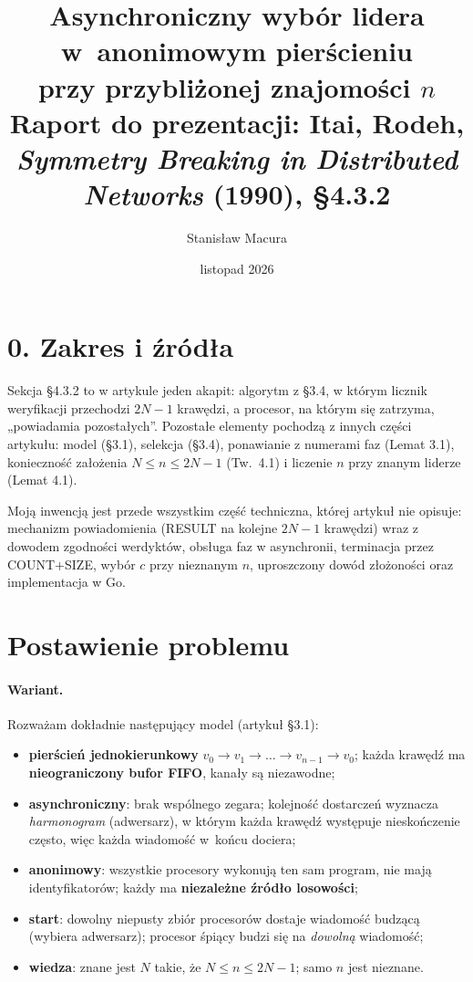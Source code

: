 \documentclass[11pt,a4paper]{article}
\title{Asynchroniczny wybór lidera w~anonimowym pierścieniu\\przy przybliżonej znajomości $n$\\[4pt]
\large Raport do prezentacji: Itai, Rodeh, \emph{Symmetry Breaking in Distributed Networks} (1990), §4.3.2}
\author{Stanisław Macura}
\date{listopad 2026}
\theoremstyle{definition}
\newcommand{\msg}[1]{\textsf{\small #1}}
\begin{document}
\maketitle

\section*{0. Zakres i źródła}

Sekcja §4.3.2 to w artykule jeden akapit: algorytm z §3.4, w którym licznik weryfikacji przechodzi
$2N-1$ krawędzi, a procesor, na którym się zatrzyma, „powiadamia pozostałych”. Pozostałe elementy
pochodzą z innych części artykułu: model (§3.1), selekcja (§3.4), ponawianie z numerami faz (Lemat 3.1),
konieczność założenia $N\le n\le2N-1$ (Tw.\ 4.1) i liczenie $n$ przy znanym liderze (Lemat 4.1).

Moją inwencją jest przede wszystkim część techniczna, której artykuł nie opisuje: mechanizm powiadomienia
(\msg{RESULT} na kolejne $2N-1$ krawędzi) wraz z dowodem zgodności werdyktów, obsługa faz w asynchronii,
terminacja przez \msg{COUNT}+\msg{SIZE}, wybór $c$ przy nieznanym $n$, uproszczony dowód złożoności
oraz implementacja w Go.

\section{Postawienie problemu}

\paragraph{Wariant.} Rozważam dokładnie następujący model (artykuł §3.1):
\begin{itemize}
\item \textbf{pierścień jednokierunkowy} $v_0\to v_1\to\dots\to v_{n-1}\to v_0$; każda krawędź ma
      \textbf{nieograniczony bufor FIFO}, kanały są niezawodne;
\item \textbf{asynchroniczny}: brak wspólnego zegara; kolejność dostarczeń wyznacza \emph{harmonogram}
      (adwersarz), w którym każda krawędź występuje nieskończenie często, więc każda wiadomość w~końcu dociera;
\item \textbf{anonimowy}: wszystkie procesory wykonują ten sam program, nie mają identyfikatorów;
      każdy ma \textbf{niezależne źródło losowości};
\item \textbf{start}: dowolny niepusty zbiór procesorów dostaje wiadomość budzącą (wybiera adwersarz);
      procesor śpiący budzi się na \emph{dowolną} wiadomość;
\item \textbf{wiedza}: znane jest $N$ takie, że $N\le n\le 2N-1$; samo $n$ jest nieznane.
\end{itemize}
\end{document}

